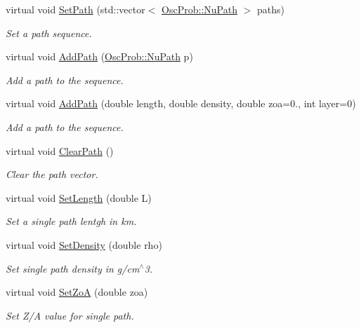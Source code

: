 \begin{DoxyCompactItemize}
virtual void \hyperlink{classOscProb_1_1PMNS__Base_a637d19dd850b4246507796526622643c}{Set\+Path} (std\+::vector$<$ \hyperlink{structOscProb_1_1NuPath}{Osc\+Prob\+::\+Nu\+Path} $>$ paths)
\begin{DoxyCompactList}\small\item\em Set a path sequence. \end{DoxyCompactList}\item 
virtual void \hyperlink{classOscProb_1_1PMNS__Base_a887dc9d4dc569ec0cdef3933b4c60efc}{Add\+Path} (\hyperlink{structOscProb_1_1NuPath}{Osc\+Prob\+::\+Nu\+Path} p)
\begin{DoxyCompactList}\small\item\em Add a path to the sequence. \end{DoxyCompactList}\item 
virtual void \hyperlink{classOscProb_1_1PMNS__Base_ab7f89ad9e7e1224adaa59d3c41594cd9}{Add\+Path} (double length, double density, double zoa=0., int layer=0)
\begin{DoxyCompactList}\small\item\em Add a path to the sequence. \end{DoxyCompactList}\item 
virtual void \hyperlink{classOscProb_1_1PMNS__Base_aefe521239031c418cfaaaa550a6e13bb}{Clear\+Path} ()
\begin{DoxyCompactList}\small\item\em Clear the path vector. \end{DoxyCompactList}\item 
virtual void \hyperlink{classOscProb_1_1PMNS__Base_a6241325b1bd28cafa556daaecbe4ed62}{Set\+Length} (double L)
\begin{DoxyCompactList}\small\item\em Set a single path lentgh in km. \end{DoxyCompactList}\item 
virtual void \hyperlink{classOscProb_1_1PMNS__Base_ac74206f349687da141392c81e2ba6b0d}{Set\+Density} (double rho)
\begin{DoxyCompactList}\small\item\em Set single path density in g/cm$^\wedge$3. \end{DoxyCompactList}\item 
virtual void \hyperlink{classOscProb_1_1PMNS__Base_a1bf3ea8fd2507fd2fd82d7410ff8f578}{Set\+ZoA} (double zoa)
\begin{DoxyCompactList}\small\item\em Set Z/A value for single path. \end{DoxyCompactList}\item 

\end{DoxyCompactItemize}
